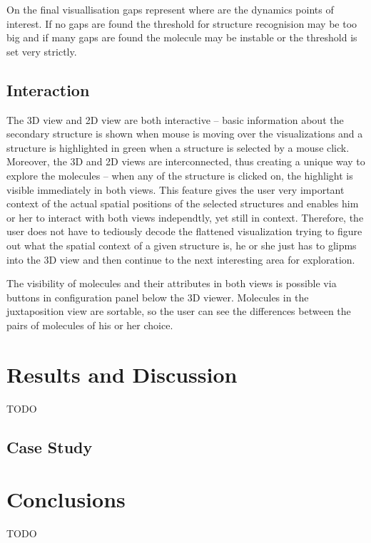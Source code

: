 \documentclass[twocolumn]{bmcart}%
\begin{document}
On the final visuallisation gaps represent where are the dynamics points of interest. If no gaps are found the threshold for structure recognision may be too big and if many gaps are found the molecule may be instable or the threshold is set very strictly.
 

\subsection*{Interaction}

The 3D view and 2D view are both interactive -- basic information about the secondary structure is shown when mouse is moving over the visualizations and a structure is highlighted in green when a structure is selected by a mouse click. Moreover, the 3D and 2D views are interconnected, thus creating a unique way to explore the molecules -- when any of the structure is clicked on, the highlight is visible immediately in both views. This feature gives the user very important context of the actual spatial positions of the selected structures and enables him or her to interact with both views independtly, yet still in context. Therefore, the user does not have to tediously decode the flattened visualization trying to figure out what the spatial context of a given structure is, he or she just has to glipms into the 3D view and then continue to the next interesting area for exploration.

The visibility of molecules and their attributes in both views is possible via buttons in configuration panel below the 3D viewer. Molecules in the juxtaposition view are sortable, so the user can see the differences between the pairs of molecules of his or her choice.



\section*{Results and Discussion}
TODO

\subsection*{Case Study}

\section*{Conclusions}
TODO
\end{document}
